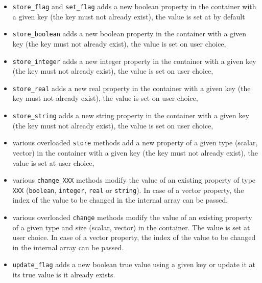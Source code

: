 \begin{itemize}

\item \texttt{store\_flag}  and \texttt{set\_flag} adds  a new boolean
  property in the container with a given key (the key must not already
  exist), the value is set at  by default

\item \texttt{store\_boolean} adds a new boolean property in the container
with a given key (the key must not already exist), the value is set on user 
choice,

\item \texttt{store\_integer} adds a new integer property in the container
with a given key (the key must not already exist), the value is set on user 
choice,

\item \texttt{store\_real} adds a new real property in the container
with a given key (the key must not already exist), the value is set on user 
choice,

\item \texttt{store\_string} adds a new string property in the container
with a given key (the key must not already exist), the value is set on user 
choice,

\item various overloaded \texttt{store}  methods add a new property of
  a given type (scalar, vector) in the container with a given key (the
  key must not already exist), the value is set at user choice,

\item  various \texttt{change\_XXX}  methods  modify the  value of  an
  existing   property    of   type   \texttt{XXX}   (\texttt{boolean},
  \texttt{integer},  \texttt{real} or \texttt{string}).  In case  of a
  vector  property,  the index  of  the value  to  be  changed in  the
  internal array can be passed.

\item various  overloaded \texttt{change} methods modify  the value of
  an existing  property of a given  type and size  (scalar, vector) in
  the container.  The value is set at user choice. In case of a vector
  property, the index of the value to be changed in the internal array
  can be passed.

\item \texttt{update\_flag} adds a new boolean true value using a given
key or update it at its true value is it already exists.


\end{itemize}
